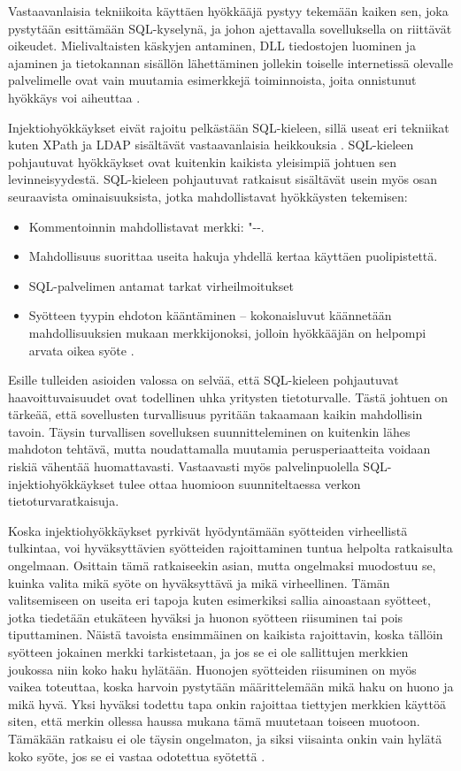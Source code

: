 Vastaavanlaisia tekniikoita käyttäen hyökkääjä pystyy tekemään kaiken sen, joka pystytään esittämään SQL-kyselynä, ja johon ajettavalla
sovelluksella on riittävät oikeudet. Mielivaltaisten käskyjen antaminen, DLL tiedostojen luominen ja ajaminen ja tietokannan
sisällön lähettäminen jollekin toiselle internetissä olevalle palvelimelle ovat vain muutamia esimerkkejä toiminnoista, joita
onnistunut hyökkäys voi aiheuttaa \cite{SQLSS}.

Injektiohyökkäykset eivät rajoitu pelkästään SQL-kieleen, sillä useat eri tekniikat kuten XPath ja LDAP sisältävät vastaavanlaisia 
heikkouksia \cite{WEB2}. SQL-kieleen pohjautuvat hyökkäykset ovat kuitenkin kaikista yleisimpiä johtuen sen levinneisyydestä. SQL-kieleen
pohjautuvat ratkaisut sisältävät usein myös osan seuraavista ominaisuuksista, jotka mahdollistavat hyökkäysten tekemisen:

\begin{itemize}
\item Kommentoinnin mahdollistavat merkki: "{-}{-}.
\item Mahdollisuus suorittaa useita hakuja yhdellä kertaa käyttäen puolipistettä.
\item SQL-palvelimen antamat tarkat virheilmoitukset
\item Syötteen tyypin ehdoton kääntäminen -- kokonaisluvut käännetään mahdollisuuksien mukaan merkkijonoksi, jolloin hyökkääjän
             on helpompi arvata oikea syöte \cite{SQLSS}.
\end{itemize}

Esille tulleiden asioiden valossa on selvää, että SQL-kieleen pohjautuvat haavoittuvaisuudet ovat todellinen uhka yritysten tietoturvalle.
Tästä johtuen on tärkeää, että sovellusten turvallisuus pyritään takaamaan kaikin mahdollisin tavoin. Täysin turvallisen sovelluksen 
suunnitteleminen on kuitenkin lähes mahdoton tehtävä, mutta noudattamalla muutamia perusperiaatteita voidaan riskiä vähentää huomattavasti.
Vastaavasti myös palvelinpuolella SQL-injektiohyökkäykset tulee ottaa huomioon suunniteltaessa verkon tietoturvaratkaisuja.

Koska injektiohyökkäykset pyrkivät hyödyntämään syötteiden virheellistä tulkintaa, voi hyväksyttävien syötteiden rajoittaminen tuntua
helpolta ratkaisulta ongelmaan. Osittain tämä ratkaiseekin asian, mutta ongelmaksi muodostuu se, kuinka valita mikä syöte on hyväksyttävä
ja mikä virheellinen. Tämän valitsemiseen on useita eri tapoja kuten esimerkiksi sallia ainoastaan syötteet, jotka tiedetään etukäteen hyväksi
ja huonon syötteen riisuminen tai pois tiputtaminen. Näistä tavoista ensimmäinen on kaikista rajoittavin, koska tällöin syötteen jokainen 
merkki tarkistetaan, ja jos se ei ole sallittujen merkkien joukossa niin koko haku hylätään. Huonojen syötteiden riisuminen on myös vaikea
toteuttaa, koska harvoin pystytään määrittelemään mikä haku on huono ja mikä hyvä. Yksi hyväksi todettu tapa onkin rajoittaa tiettyjen
merkkien käyttöä siten, että merkin ollessa haussa mukana tämä muutetaan toiseen muotoon. Tämäkään ratkaisu ei ole täysin ongelmaton, ja siksi
viisainta onkin vain hylätä koko syöte, jos se ei vastaa odotettua syötettä \cite{SQLSS}.

